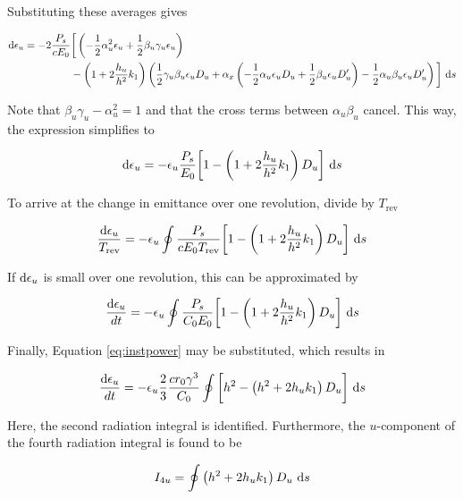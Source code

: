 Substituting these averages gives

\begin{align}
    \text{d} \epsilon_u = - 2 \frac{P_s}{cE_0} &\bigg[ \left( - \frac{1}{2} \alpha_u^2 \epsilon_u + \frac{1}{2} \beta_u \gamma_u \epsilon_u \right) \\
    &- \left( 1 + 2 \frac{h_u}{h^2} k_1 \right) \left( \frac{1}{2} \gamma_u \beta_u \epsilon_u D_u  + \alpha_x \left(-\frac{1}{2} \alpha_u \epsilon_u D_u + \frac{1}{2} \beta_u \epsilon_u D_u' \right) - \frac{1}{2} \alpha_u \beta_u \epsilon_u D_u' \right) \bigg]\ \text{d} s
\end{align}

Note that $\beta_u \gamma_u - \alpha_u^2 = 1$ and that the cross terms between $\alpha_u\beta_u$ cancel. This way, the expression simplifies to

\begin{align}
    \text{d} \epsilon_u = - \epsilon_u \frac{P_s}{E_0} \bigg[ 1 - \left( 1 + 2 \frac{h_u}{h^2} k_1 \right) D_u \bigg]\ \text{d} s
\end{align}

To arrive at the change in emittance over one revolution, divide by $T_\text{rev}$

\begin{align}
    \frac{\text{d} \epsilon_u}{T_\text{rev}} = - \epsilon_u \oint \frac{P_s}{cE_0 T_\text{rev}} \bigg[ 1 - \left( 1 + 2 \frac{h_u}{h^2} k_1 \right) D_u \bigg]\ \text{d} s
\end{align}

If $\text{d} \epsilon_u$ is small over one revolution, this can be approximated by

\begin{equation}
    \frac{\text{d} \epsilon_u}{dt} = - \epsilon_u \oint \frac{P_s}{C_0 E_0} \bigg[ 1 - \left( 1 + 2 \frac{h_u}{h^2} k_1 \right) D_u \bigg]\ \text{d} s
\end{equation}

Finally, Equation \eqref{eq:instpower} may be substituted, which results in

\begin{equation}
    \frac{\text{d} \epsilon_u}{dt} = - \epsilon_u \frac{2}{3} \frac{c r_0 \gamma^3}{C_0} \oint \bigg[ h^2 - \left( h^2 + 2 h_u k_1 \right) D_u \bigg]\ \text{d} s
\end{equation}

Here, the second radiation integral is identified. Furthermore, the $u$-component of the fourth radiation integral is found to be

\begin{equation}
    I_{4u} = \oint \left( h^2 + 2 h_u k_1 \right) D_u\ \text{d} s
\end{equation}

